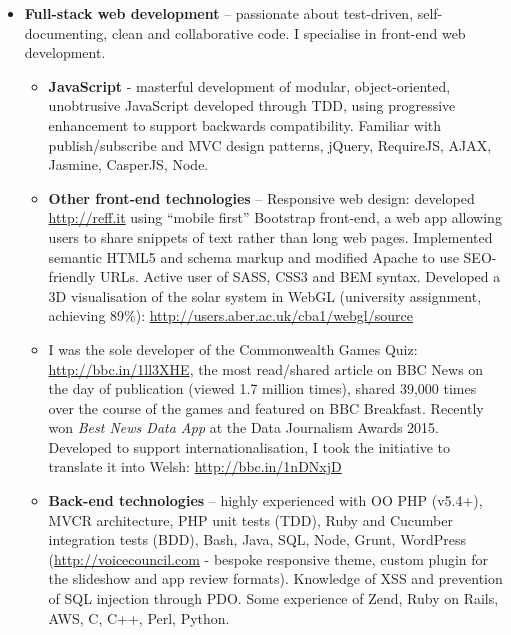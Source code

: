 \documentclass[a4paper,10pt]{article}
\begin{document}
\begin{itemize}
    \setlength\itemsep{0.3em}

    \item \textbf{Full-stack web development} – passionate about test-driven, self-documenting, clean and collaborative code. I specialise in front-end web development.

    \begin{itemize}
        \setlength\itemsep{0.3em}

        \item \textbf{JavaScript} - masterful development of modular, object-oriented, unobtrusive JavaScript developed through TDD, using progressive enhancement to support backwards compatibility. Familiar with publish/subscribe and MVC design patterns, jQuery, RequireJS, AJAX, Jasmine, CasperJS, Node.

        \item \textbf{Other front-end technologies} – Responsive web design: developed \url{http://reff.it} using “mobile first” Bootstrap front-end, a web app allowing users to share snippets of text rather than long web pages. Implemented semantic HTML5 and schema markup and modified Apache to use SEO-friendly URLs. Active user of SASS, CSS3 and BEM syntax. Developed a 3D visualisation of the solar system in WebGL (university assignment, achieving 89\%): \url{http://users.aber.ac.uk/cba1/webgl/source}

        \item I was the sole developer of the Commonwealth Games Quiz: \url{http://bbc.in/1ll3XHE}, the most read/shared article on BBC News on the day of publication (viewed 1.7 million times), shared 39,000 times over the course of the games and featured on BBC Breakfast. Recently won \emph{Best News Data App} at the Data Journalism Awards 2015. Developed to support internationalisation, I took the initiative to translate it into Welsh: \url{http://bbc.in/1nDNxjD}

        \item \textbf{Back-end technologies} – highly experienced with OO PHP (v5.4+), MVCR architecture, PHP unit tests (TDD), Ruby and Cucumber integration tests (BDD), Bash, Java, SQL, Node, Grunt, WordPress (\url{http://voicecouncil.com} - bespoke responsive theme, custom plugin for the slideshow and app review formats). Knowledge of XSS and prevention of SQL injection through PDO. Some experience of Zend, Ruby on Rails, AWS, C, C++, Perl, Python.

    \end{itemize}


\end{itemize}
\end{document}
